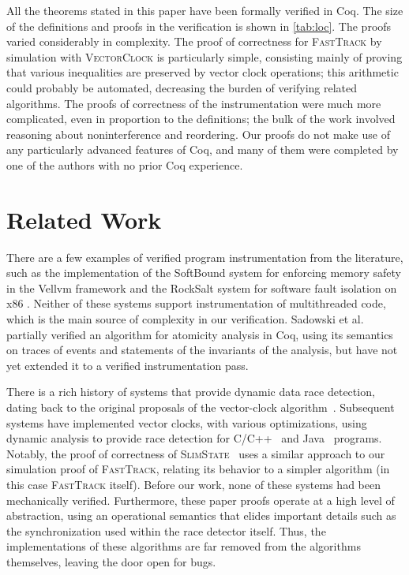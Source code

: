 \documentclass[preprint, 9pt]{sigplanconf}
\newcommand{\VCalg}{\textsc{VectorClock}\xspace}
\newcommand{\FT}{\textsc{FastTrack}\xspace}
\begin{document}
All the theorems stated in this paper have been formally verified in Coq. The size of the definitions and proofs in the verification is shown in \autoref{tab:loc}. The proofs varied considerably in complexity. The proof of correctness for \FT by simulation with \VCalg is particularly simple, consisting mainly of proving that various inequalities are preserved by vector clock operations; this arithmetic could probably be automated, decreasing the burden of verifying related algorithms. The proofs of correctness of the instrumentation were much more complicated, even in proportion to the definitions; the bulk of the work involved reasoning about noninterference and reordering. Our proofs do not make use of any particularly advanced features of Coq, and many of them were completed by one of the authors with no prior Coq experience.

\section{Related Work}
\label{related}

There are a few examples of verified program instrumentation from the literature, such as
the implementation of the SoftBound system for enforcing memory safety in the Vellvm framework \cite{vellvm} and the RockSalt system for software fault isolation on x86 \cite{Morrisett:2012:RBF:2254064.2254111}. Neither of these systems support instrumentation of multithreaded code, which is the main source of complexity in our verification. Sadowski et al.~\cite{coqatomicity} partially verified an algorithm for atomicity analysis in Coq, using its semantics on traces of events and statements of the invariants of the analysis, but have not yet extended it to a verified instrumentation pass.

There is a rich history of systems that provide dynamic data race detection, dating back to the original proposals of the vector-clock algorithm~\cite{vcfidge,vcmattern,lamporthb}. Subsequent systems have implemented vector clocks, with various optimizations, using dynamic analysis to provide race detection for C/C++~\cite{pozniansky_efficient_2003,serebryany_threadsanitizer:_2009} and Java~\cite{christiaens_trade:_2001,elmas_goldilocks:_2007,fasttrack,slimstate} programs. Notably, the proof of correctness of \textsc{SlimState}~\cite{slimstate} uses a similar approach to our simulation proof of \FT, relating its behavior to a simpler algorithm (in this case \FT itself). Before our work, none of these systems had been mechanically verified. Furthermore, these paper proofs operate at a high level of abstraction, using an operational semantics that elides important details such as the synchronization used within the race detector itself. Thus, the implementations of these algorithms are far removed from the algorithms themselves, leaving the door open for bugs.
\end{document}
